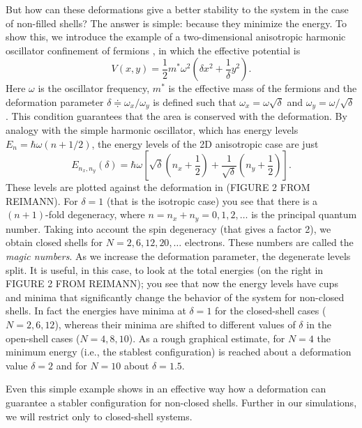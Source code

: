 \documentclass[a4paper,twoside,11pt]{book}
\begin{document}
But how can these deformations give a better stability to the system in the case of non-filled shells? The answer is simple: because they minimize the energy. To show this, we introduce the example of a two-dimensional anisotropic harmonic oscillator confinement of fermions \citep[as in][]{Reimann2002}, in which the effective potential is 
\begin{equation}
	V(x,y) = \frac{1}{2}m^*\omega^2\left(\delta x^2 + \frac{1}{\delta}y^2\right).
\end{equation}
Here $\omega$ is the oscillator frequency, $m^*$ is the effective mass of the fermions and the deformation parameter $\delta \doteqdot \omega_x/\omega_y$ is defined such that $\omega_x=\omega\sqrt{\delta}$ and $\omega_y=\omega/\sqrt{\delta}$. This condition guarantees that the area is conserved with the deformation. By analogy with the simple harmonic oscillator, which has energy levels $E_n = \hbar\omega(n+1/2)$, the energy levels of the 2D anisotropic case are just
\begin{equation}
	E_{n_x,n_y}(\delta) = \hbar\omega\left[\sqrt{\delta}\left(n_x+\frac{1}{2}\right) + \frac{1}{\sqrt{\delta}}\left(n_y+\frac{1}{2}\right)\right].
\end{equation}
These levels are plotted against the deformation in (FIGURE 2 FROM REIMANN). For $\delta=1$ (that is the isotropic case) you see that there is a $(n+1)$-fold degeneracy, where $n=n_x+n_y=0,1,2,\ldots$ is the principal quantum number. Taking into account the spin degeneracy (that gives a factor 2), we obtain closed shells for $N=2,6,12,20,\ldots$ electrons. These numbers are called the \emph{magic numbers}. As we increase the deformation parameter, the degenerate levels split. It is useful, in this case, to look at the total energies (on the right in FIGURE 2 FROM REIMANN); you see that now the energy levels have cups and minima that significantly change the behavior of the system for non-closed shells. In fact the energies have minima at $\delta=1$ for the closed-shell cases ($N=2,6,12$), whereas their minima are shifted to different values of $\delta$ in the open-shell cases ($N=4,8,10$). As a rough graphical estimate, for $N=4$ the minimum energy (i.e., the stablest configuration) is reached about a deformation value $\delta=2$ and for $N=10$ about $\delta=1.5$.

Even this simple example shows in an effective way how a deformation can guarantee a stabler configuration for non-closed shells. Further in our simulations, we will restrict only to closed-shell systems.
\end{document}
